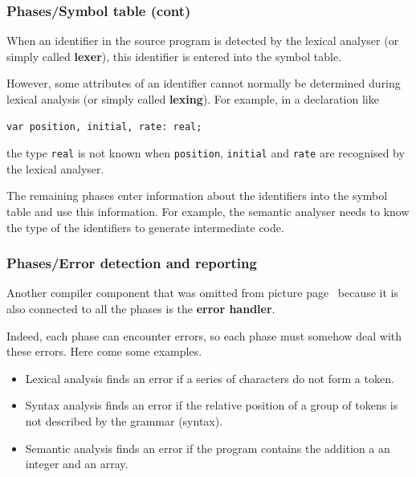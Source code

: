%
\begin{frame}[containsverbatim]
\frametitle{Phases/Symbol table (cont)}

When an identifier in the source program is detected by the lexical
analyser (or simply called \textbf{lexer}), this identifier is entered
into the symbol table.

\bigskip

However, some attributes of an identifier cannot normally be
determined during lexical analysis (or simply called
\textbf{lexing}). For example, in a \Pascal declaration like {\small
\begin{verbatim}
var position, initial, rate: real;
\end{verbatim}
}
the type \texttt{real} is not known when \texttt{position},
\texttt{initial} and \texttt{rate} are recognised by the lexical
analyser.

\bigskip

The remaining phases enter information about the identifiers into the
symbol table and use this information. For example, the semantic
analyser needs to know the type of the identifiers to generate
intermediate code.

\end{frame}

%
\begin{frame}
\frametitle{Phases/Error detection and reporting}

Another compiler component that was omitted from picture
page~\pageref{phases} because it is also connected to all the phases
is the \textbf{error handler}.

\bigskip

Indeed, each phase can encounter errors, so each phase must somehow
deal with these errors. Here come some examples.
\begin{itemize}

  \item Lexical analysis finds an error if a series of characters do
  not form a token.

  \item Syntax analysis finds an error if the relative position of a
  group of tokens is not described by the grammar (syntax).

  \item Semantic analysis finds an error if the program contains
  the addition a an integer and an array.

\end{itemize}

\end{frame}

